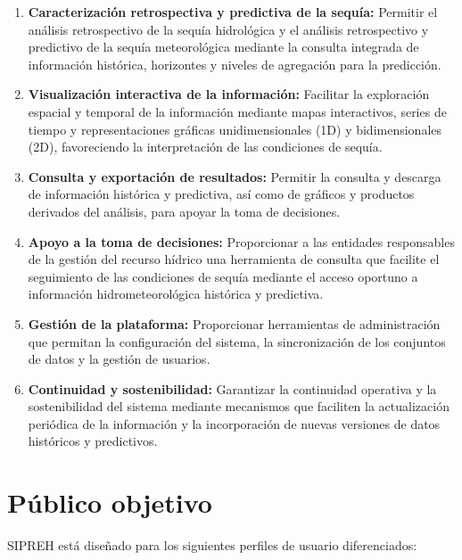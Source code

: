 \begin{enumerate}
    \item \textbf{Caracterización retrospectiva y predictiva de la sequía:} Permitir el análisis retrospectivo de la sequía hidrológica y el análisis retrospectivo y predictivo de la sequía meteorológica mediante la consulta integrada de información histórica, horizontes y niveles de agregación para la predicción.

    \item \textbf{Visualización interactiva de la información:} Facilitar la exploración espacial y temporal de la información mediante mapas interactivos, series de tiempo y representaciones gráficas unidimensionales (1D) y bidimensionales (2D), favoreciendo la interpretación de las condiciones de sequía.

    \item \textbf{Consulta y exportación de resultados:} Permitir la consulta y descarga de información histórica y predictiva, así como de gráficos y productos derivados del análisis, para apoyar la toma de decisiones.
    
    \item \textbf{Apoyo a la toma de decisiones:} Proporcionar a las entidades responsables de la gestión del recurso hídrico una herramienta de consulta que facilite el seguimiento de las condiciones de sequía mediante el acceso oportuno a información hidrometeorológica histórica y predictiva.
    
    \item \textbf{Gestión de la plataforma:} Proporcionar herramientas de administración que permitan la configuración del sistema, la sincronización de los conjuntos de datos y la gestión de usuarios.

    \item \textbf{Continuidad y sostenibilidad:} Garantizar la continuidad operativa y la sostenibilidad del sistema mediante mecanismos que faciliten la actualización periódica de la información y la incorporación de nuevas versiones de datos históricos y predictivos.

\end{enumerate}

\section{Público objetivo}
\label{sec:publico}

SIPREH está diseñado para los siguientes perfiles de usuario diferenciados:

